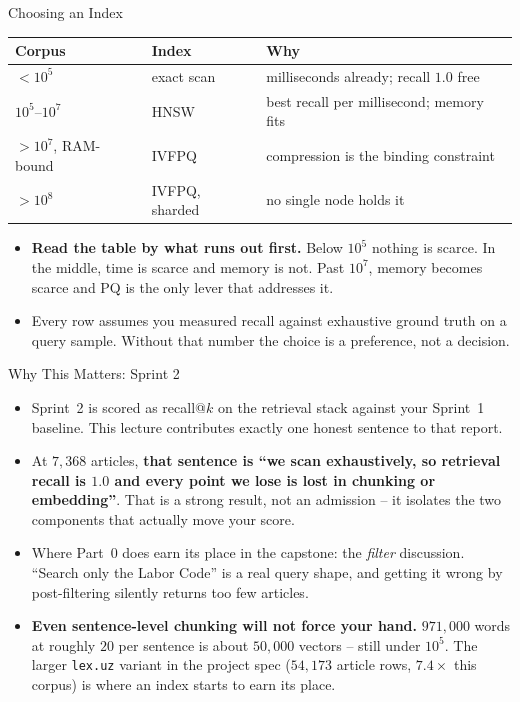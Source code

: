 \begin{frame}{Choosing an Index}
\centering
\small
\begin{tabular}{@{}l|l|l@{}}
\textbf{Corpus} & \textbf{Index} & \textbf{Why} \\
\hline
$< 10^5$ & exact scan & milliseconds already; recall $1.0$ free \\[2pt]
$10^5$--$10^7$ & HNSW & best recall per millisecond; memory fits \\[2pt]
$> 10^7$, RAM-bound & IVFPQ & compression is the binding constraint \\[2pt]
$> 10^8$ & IVFPQ, sharded & no single node holds it \\
\end{tabular}

\vspace{0.7em}
\begin{itemize}
  \item \textbf{Read the table by what runs out first.} Below $10^5$ nothing is scarce. In the middle, time is scarce and memory is not. Past $10^7$, memory becomes scarce and PQ is the only lever that addresses it.
  \pause
  \item Every row assumes you measured recall against exhaustive ground truth on a query sample. Without that number the choice is a preference, not a decision.
\end{itemize}
\end{frame}

\begin{frame}{Why This Matters: Sprint 2}
\begin{itemize}
  \item Sprint~2 is scored as recall@$k$ on the retrieval stack against your Sprint~1 baseline. This lecture contributes exactly one honest sentence to that report.
  \pause
  \item At $7{,}368$ articles, \textbf{that sentence is ``we scan exhaustively, so retrieval recall is $1.0$ and every point we lose is lost in chunking or embedding''}. That is a strong result, not an admission -- it isolates the two components that actually move your score.
  \pause
  \item Where Part~0 does earn its place in the capstone: the \emph{filter} discussion. ``Search only the Labor Code'' is a real query shape, and getting it wrong by post-filtering silently returns too few articles.
  \pause
  \item \textbf{Even sentence-level chunking will not force your hand.} $971{,}000$ words at roughly $20$ per sentence is about $50{,}000$ vectors -- still under $10^5$. The larger \texttt{lex.uz} variant in the project spec ($54{,}173$ article rows, $7.4\times$ this corpus) is where an index starts to earn its place.
\end{itemize}
\end{frame}

